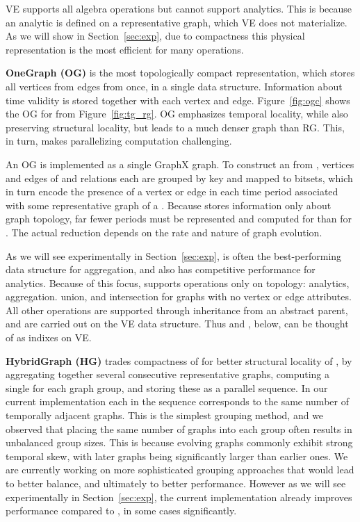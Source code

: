 
VE supports all \tg algebra operations but cannot support analytics.
This is because an analytic is defined on a representative graph,
which VE does not materialize.  As we will show in
Section~\ref{sec:exp}, due to compactness this physical representation
is the most efficient for many operations.

{\bf OneGraph (OG)} is the most topologically compact representation,
which stores all vertices from  edges from \tae once, in
a single data structure.  Information about time validity is stored
together with each vertex and edge.  Figure~\ref{fig:ogc} shows the OG
for  from Figure~\ref{fig:tg_rg}.  OG emphasizes temporal
locality, while also preserving structural locality, but leads to a
much denser graph than RG.  This, in turn, makes parallelizing
computation challenging.

An OG is implemented as a single GraphX graph.  To construct an \og
from \tve, vertices and edges of \tv and \te relations each are
grouped by key and mapped to bitsets, which in turn encode the
presence of a vertex or edge in each time period associated with some
representative graph of a \tg.  Because \og stores information only
about graph topology, far fewer periods must be represented and
computed for \og than for \rg.  The actual reduction depends on the
rate and nature of graph evolution.

As we will see experimentally in Section~\ref{sec:exp}, \og is often
the best-performing data structure for aggregation, and also has
competitive performance for analytics.  Because of this focus, \og
supports operations only on topology: analytics, aggregation. union,
and intersection for graphs with no vertex or edge attributes.  All
other operations are supported through inheritance from an abstract
parent, and are carried out on the VE data structure.  Thus \og and
\hg, below, can be thought of as indixes on VE.

{\bf HybridGraph (HG)} trades compactness of \og for better structural
locality of \rg, by aggregating together several consecutive
representative graphs, computing a single \og for each graph group,
and storing these as a parallel sequence.  In our current
implementation each \og in the sequence corresponds to the same number
of temporally adjacent graphs.
%
This is the simplest grouping method, and we observed that placing the
same number of graphs into each group often results in unbalanced
group sizes.  This is because evolving graphs commonly exhibit strong
temporal skew, with later graphs being significantly larger than earlier
ones.  We are currently working on more sophisticated grouping
approaches that would lead to better balance, and ultimately to better
performance.  However as we will see experimentally in
Section~\ref{sec:exp}, the current \hg implementation already improves
performance compared to \og, in some cases significantly.

